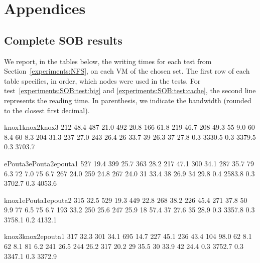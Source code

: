 \section{Appendices}
%
\subsection{Complete SOB results}
\label{appendix:SOB}

We report, in the tables below, the writing times for each test from
Section~\ref{experiments:NFS}, on each VM of the chosen set.
%
The first row of each table specifies, in order, which nodes were used
in the tests.
%
For test~\ref{experiments:SOB:test:big} and
\ref{experiments:SOB:test:cache}, the second line represents the
reading time. In parenthesis, we indicate the bandwidth (rounded to
the closest first decimal).%

\noindent%
\resultpartition%
{{knox1}{knox2}{knox3}}%
{{ 212 }{ 48.4   }{ 487 }{ 21.0   }{ 492 }{ 20.8   }}%
{{ 166 }{ 61.8   }{ 219 }{ 46.7   }{ 208 }{ 49.3   }}%
{{  55 }{ 9.0    }{  60 }{ 8.4    }{  60 }{ 8.3    }}%
{{ 204 }{ 31.3   }{ 237 }{ 27.0   }{ 243 }{ 26.4   }}%
{{  26 }{ 33.7   }{  39 }{ 26.3   }{  37 }{ 27.8   }}%
{{ 0.3 }{ 3330.5 }{ 0.3 }{ 3379.5 }{ 0.3 }{ 3703.7 }}

\noindent%
\resultpartition%
{{ePouta3}{ePouta2}{epouta1}}%
{{ 527 }{ 19.4   }{ 399 }{ 25.7   }{ 363 }{ 28.2   }}%
{{ 217 }{ 47.1   }{ 300 }{ 34.1   }{ 287 }{ 35.7   }}%
{{  79 }{ 6.3    }{  72 }{ 7.0    }{  75 }{ 6.7    }}%
{{ 267 }{ 24.0   }{ 259 }{ 24.8   }{ 267 }{ 24.0   }}%
{{  31 }{ 33.4   }{  38 }{ 26.9   }{  34 }{ 29.8   }}%
{{ 0.4 }{ 2583.8 }{ 0.3 }{ 3702.7 }{ 0.3 }{ 4053.6 }}

\noindent%
\resultpartition%
{{knox1}{ePouta1}{epouta2}}%
{{ 315 }{ 32.5   }{ 529 }{ 19.3   }{ 449 }{ 22.8   }}%
{{ 268 }{ 38.2   }{ 226 }{ 45.4   }{ 271 }{ 37.8   }}%
{{  50 }{ 9.9    }{  77 }{ 6.5    }{  75 }{ 6.7    }}%
{{ 193 }{ 33.2   }{ 250 }{ 25.6   }{ 247 }{ 25.9   }}%
{{  18 }{ 57.4   }{  37 }{ 27.6   }{  35 }{ 28.9   }}%
{{ 0.3 }{ 3357.8 }{ 0.3 }{ 3758.1 }{ 0.2 }{ 4132.1 }}

\noindent%
\resultpartition%
{{knox3}{knox2}{epouta1}}%
{{ 317 }{ 32.3   }{ 301 }{ 34.1   }{ 695 }{ 14.7   }}%
{{ 227 }{ 45.1   }{ 236 }{ 43.4   }{ 104 }{ 98.0   }}%
{{  62 }{  8.1   }{  62 }{  8.1   }{  81 }{  6.2   }}%
{{ 241 }{ 26.5   }{ 244 }{ 26.2   }{ 317 }{ 20.2   }}%
{{  29 }{ 35.5   }{  30 }{ 33.9   }{  42 }{ 24.4   }}%
{{ 0.3 }{ 3752.7 }{ 0.3 }{ 3347.1 }{ 0.3 }{ 3372.9 }}

